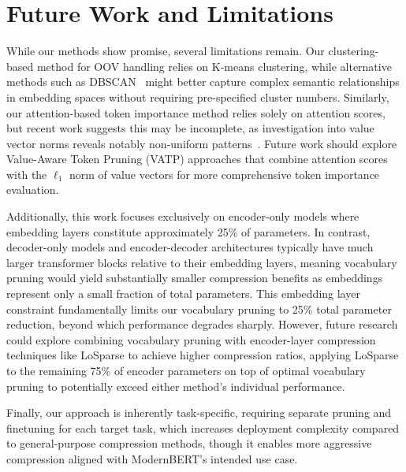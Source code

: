 \documentclass[twocolumn]{article}
\begin{document}
\section{Future Work and Limitations}
While our methods show promise, several limitations remain.
Our clustering-based method for OOV handling relies on K-means clustering, while alternative methods such as DBSCAN~\cite{wang2019dbscan} might better capture complex semantic relationships in embedding spaces without requiring pre-specified cluster numbers.
Similarly, our attention-based token importance method relies solely on attention scores, but recent work suggests this may be incomplete, as investigation into value vector norms reveals notably non-uniform patterns~\cite{guo2024attention}. Future work should explore Value-Aware Token Pruning (VATP) approaches that combine attention scores with the $\ell_1$ norm of value vectors for more comprehensive token importance evaluation. 

Additionally, this work focuses exclusively on encoder-only models where embedding layers constitute approximately 25\% of parameters. In contrast, decoder-only models and encoder-decoder architectures typically have much larger transformer blocks relative to their embedding layers, meaning vocabulary pruning would yield substantially smaller compression benefits as embeddings represent only a small fraction of total parameters. 
This embedding layer constraint fundamentally limits our vocabulary pruning to 25\% total parameter reduction, beyond which performance degrades sharply. However, future research could explore combining vocabulary pruning with encoder-layer compression techniques like LoSparse to achieve higher compression ratios, applying LoSparse to the remaining 75\% of encoder parameters on top of optimal vocabulary pruning to potentially exceed either method's individual performance.

Finally, our approach is inherently task-specific, requiring separate pruning and finetuning for each target task, which increases deployment complexity compared to general-purpose compression methods, though it enables more aggressive compression aligned with ModernBERT's intended use case.


{\footnotesize


}
\end{document}

